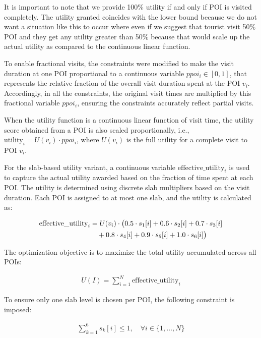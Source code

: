 {\begin{itemize}
It is important to note that we provide 100\% utility if and only if POI is visited completely. The utility granted coincides with the lower bound because we do not want a situation like this to occur where even if we suggest that tourist visit 50\% POI and they get any utility greater than 50\% because that would scale up the actual utility as compared to the continuous linear function.
\end{itemize}

To enable fractional visits, the constraints were modified to make the visit duration at one POI proportional to a continuous variable \( ppoi_i \in [0,1] \), that represents the relative fraction of the overall visit duration spent at the POI \( v_i \). Accordingly, in all the constraints, the original visit times are multiplied by this fractional variable \( ppoi_i \), ensuring the constraints accurately reflect partial visits.

When the utility function is a continuous linear function of visit time, the utility score obtained from a POI is also scaled proportionally, i.e., \( \text{utility}_i = U(v_i) \cdot ppoi_i \), where \( U(v_i) \) is the full utility for a complete visit to POI \( v_i \).

For the slab-based utility variant, a continuous variable \( \text{effective\_utility}_i \) is used to capture the actual utility awarded based on the fraction of time spent at each POI. The utility is determined using discrete slab multipliers based on the visit duration. Each POI is assigned to at most one slab, and the utility is calculated as:

\begin{align}
\label{effective_utility}
\text{effective\_utility}_i &= U(v_i) \cdot \big(0.5 \cdot s_1[i] + 0.6 \cdot s_2[i] + 0.7 \cdot s_3[i] \notag \\
&\quad + 0.8 \cdot s_4[i] + 0.9 \cdot s_5[i] + 1.0 \cdot s_6[i] \big)
\end{align}

The optimization objective is to maximize the total utility accumulated across all POIs:

\begin{align}
\label{objective_fun_slabs}
U(I) = \sum_{i=1}^N \text{effective\_utility}_i
\end{align}

To ensure only one slab level is chosen per POI, the following constraint is imposed:

\begin{align}
\sum_{k=1}^{6} s_k[i] \leq 1, \quad \forall i \in \{1, \dots, N\}
\end{align}

}


